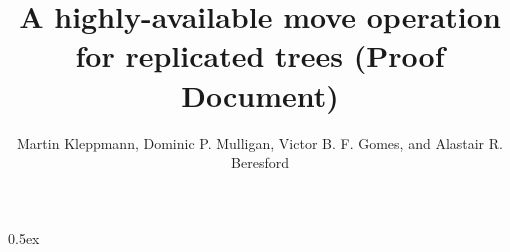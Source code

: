 \documentclass[10pt]{article}
\begin{document}
\title{A highly-available move operation for replicated trees (Proof Document)}
\author{Martin Kleppmann, Dominic P. Mulligan, Victor B. F. Gomes, and Alastair R. Beresford}
\date{}
\maketitle
\tableofcontents
\parindent 0pt\parskip 0.5ex

\end{document}
